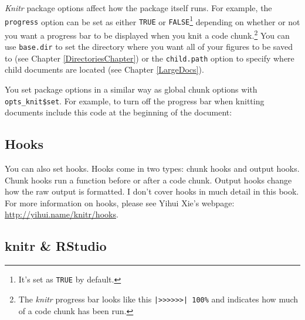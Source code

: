 {\emph{Knitr}} package options affect how the package itself runs. For example, the {\tt{progress}} option can be set as either {\tt{TRUE}} or {\tt{FALSE}}\footnote{It's set as {\tt{TRUE}} by default.} depending on whether or not you want a progress bar to be displayed when you knit a code chunk.\footnote{The {\emph{knitr}} progress bar looks like this {\tt{|>>>>>>| 100\%}} and indicates how much of a code chunk has been run.} You can use {\tt{base.dir}} to set the directory where you want all of your figures to be saved to (see Chapter \ref{DirectoriesChapter}) or the {\tt{child.path}} option to specify where child documents are located (see Chapter \ref{LargeDocs}).

You set package options in a similar way as global chunk options with {\tt{opts\_knit\$set}}. For example, to turn off the progress bar when knitting documents include this code at the beginning of the document:

\begin{knitrout}
    \color{fgcolor}
\end{knitrout}


\subsection{Hooks}

You can also set hooks. Hooks come in two types: chunk hooks and output hooks. Chunk hooks run a function before or after a code chunk. Output hooks change how the raw output is formatted. I don't cover hooks in much detail in this book. For more information on hooks, please see Yihui Xie's webpage: \url{http://yihui.name/knitr/hooks}.

\subsection{knitr \& RStudio}

